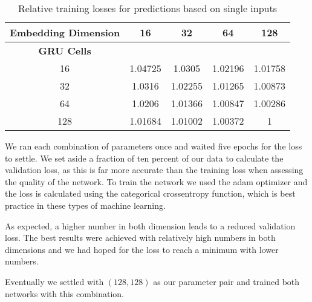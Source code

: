   \begin{table}[htpb]
    \centering
    \label{tab:single}
    \begin{tabular}{| c | c | c | c | c |}
      \hline \textbf{Embedding Dimension}  & 16  & 32  & 64 & 128 \\ \hline
      \textbf{GRU Cells} &  & & & \\
      16 & \cellcolor[rgb]{0.9,0.6,0}1.04725 & \cellcolor[rgb]{0.8,0.65,0}  1.0305 & \cellcolor[rgb]{0.75,0.7,0}  1.02196 & \cellcolor[rgb]{0.7,0.75,0}  1.01758 \\ \hline
      32 & \cellcolor[rgb]{0.85,0.65,0} 1.0316 &\cellcolor[rgb]{0.8,0.7,0} 1.02255 &\cellcolor[rgb]{0.65,0.85,0}  1.01265 & \cellcolor[rgb]{0.6,0.9,0} 1.00873 \\ \hline
      64 &\cellcolor[rgb]{0.75,0.75,0}  1.0206 &\cellcolor[rgb]{0.65,0.8,0}  1.01366 & \cellcolor[rgb]{0.55,0.9,0} 1.00847 & \cellcolor[rgb]{0.5,0.95,0} 1.00286 \\ \hline
      128 &\cellcolor[rgb]{0.7,0.8,0}  1.01684 &\cellcolor[rgb]{0.6,0.85,0}  1.01002 & \cellcolor[rgb]{0.55,0.95,0} 1.00372 & \cellcolor[rgb]{0.5,1,0} 1 \\ \hline
    \end{tabular}
    \caption{Relative training losses for predictions based on single inputs}
  \end{table}

    We ran each combination of parameters once and waited five epochs for the loss to settle. We set aside
    a fraction of ten percent of our data to calculate the validation loss, as this is far more
    accurate than the training loss when assessing the quality of the network. To train the network
    we used the adam optimizer and the loss is calculated using the categorical crossentropy function, which
    is best practice in these types of machine learning.

    As expected, a higher number in both dimension leads to a reduced validation loss. The best results
    were achieved with relatively high numbers in both dimensions and we had hoped for the loss to
    reach a minimum with lower numbers.

    Eventually we settled with $(128,128)$ as our parameter pair and trained both networks with this combination.
  
